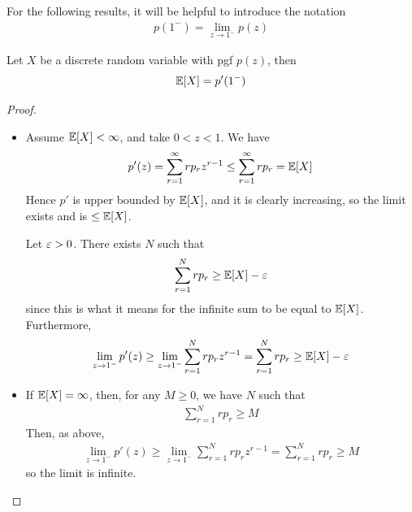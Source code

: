 \documentclass{../template/note}
\begin{document}
    For the following results, it will be helpful to introduce the notation
    \begin{align*}
        p(1^-) = \lim_{z \to 1^-} p(z)
    \end{align*}

    \begin{proposition}
        Let \(X\) be a discrete random variable with pgf \(p(z)\), then
        \begin{align*}
            \mathbb E[X] = p'(1^-)
        \end{align*}
    \end{proposition}
    
    \begin{proof}
        \begin{itemize}
            \item Assume \(\mathbb E[X] < \infty\), and take \(0 < z < 1\). We have
            \begin{align*}
                p'(z) = \sum_{r=1}^\infty rp_r z^{r-1} \leq \sum_{r=1}^\infty rp_r = \mathbb E[X]
            \end{align*}
            Hence \(p'\) is upper bounded by \(\mathbb E[X]\), and it is clearly increasing, so the limit exists and is \(\leq \mathbb E[X]\).

            Let \(\varepsilon > 0\). There exists \(N\) such that
            \begin{align*}
                \sum_{r=1}^N rp_r \geq \mathbb E[X] - \varepsilon
            \end{align*}
            since this is what it means for the infinite sum to be equal to \(\mathbb E[X]\). Furthermore,
            \begin{align*}
                \lim_{z \to 1^-} p'(z) \geq \lim_{z \to 1^-} \sum_{r=1}^N rp_r z^{r-1} = \sum_{r=1}^N rp_r \geq \mathbb E[X] - \varepsilon
            \end{align*}
            \item If \(\mathbb E[X] = \infty\), then, for any \(M \geq 0\), we have \(N\) such that
            \begin{align*}
                \sum_{r=1}^N rp_r \geq M
            \end{align*}
            Then, as above,
            \begin{align*}
                \lim_{z \to 1^-} p'(z) \geq \lim_{z \to 1^-} \sum_{r=1}^N rp_r z^{r-1} = \sum_{r=1}^N rp_r \geq M
            \end{align*}
            so the limit is infinite.
        \end{itemize}
    \end{proof}
    
\end{document}
